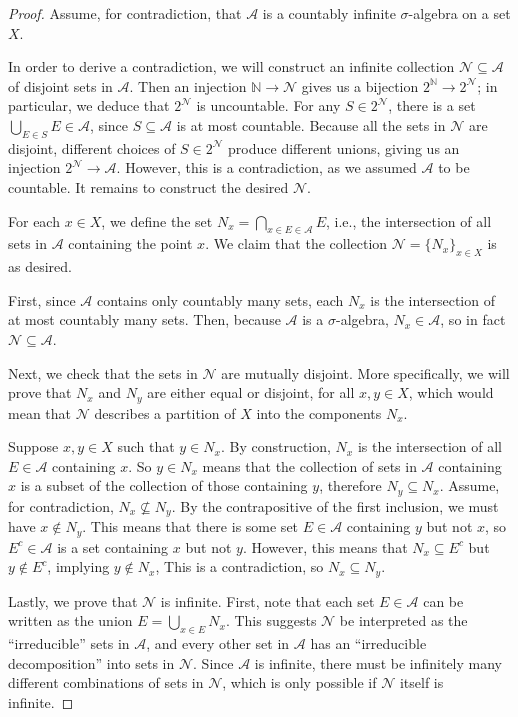 \documentclass[12pt]{article}
\newcommand{\N}{\mathbb{N}}
\newcommand{\<}{\langle}
\renewcommand{\>}{\rangle}
\theoremstyle{definition}
\renewcommand{\AA}{\mathcal{A}}
\newcommand{\NN}{\mathcal{N}}
\begin{document}
\begin{proof}
    Assume, for contradiction, that $\AA$ is a countably infinite $\sigma$-algebra on a set $X$.
    
    In order to derive a contradiction, we will construct an infinite collection $\NN \subseteq \AA$ of disjoint sets in $\AA$. Then an injection $\N \to \NN$ gives us a bijection $2^\N \to 2^\NN$; in particular, we deduce that $2^\NN$ is uncountable. For any $S \in 2^\NN$, there is a set $\bigcup_{E \in S} E \in \AA$, since $S \subseteq \AA$ is at most countable. Because all the sets in $\NN$ are disjoint, different choices of $S \in 2^\NN$ produce different unions, giving us an injection $2^\NN \to \AA$. However, this is a contradiction, as we assumed $\AA$ to be countable. It remains to construct the desired $\NN$.
    
    For each $x \in X$, we define the set $N_x = \bigcap_{x \in E \in \AA} E$, i.e., the intersection of all sets in $\AA$ containing the point $x$. We claim that the collection $\NN = \{N_x\}_{x \in X}$ is as desired.
    
    First, since $\AA$ contains only countably many sets, each $N_x$ is the intersection of at most countably many sets. Then, because $\AA$ is a $\sigma$-algebra, $N_x \in \AA$, so in fact $\NN \subseteq \AA$.
    
    Next, we check that the sets in $\NN$ are mutually disjoint. More specifically, we will prove that $N_x$ and $N_y$ are either equal or disjoint, for all $x, y \in X$, which would mean that $\NN$ describes a partition of $X$ into the components $N_x$.
    
    Suppose $x, y \in X$ such that $y \in N_x$. By construction, $N_x$ is the intersection of all $E \in \AA$ containing $x$. So $y \in N_x$ means that the collection of sets in $\AA$ containing $x$ is a subset of the collection of those containing $y$, therefore $N_y \subseteq N_x$. Assume, for contradiction, $N_x \nsubseteq N_y$. By the contrapositive of the first inclusion, we must have $x \notin N_y$. This means that there is some set $E \in \AA$ containing $y$ but not $x$, so $E^c \in \AA$ is a set containing $x$ but not $y$. However, this means that $N_x \subseteq E^c$ but $y \notin E^c$, implying $y \notin N_x$, This is a contradiction, so $N_x \subseteq N_y$.
    
    Lastly, we prove that $\NN$ is infinite. First, note that each set $E \in \AA$ can be written as the union $E = \bigcup_{x \in E} N_x$. This suggests $\NN$ be interpreted as the ``irreducible'' sets in $\AA$, and every other set in $\AA$ has an ``irreducible decomposition'' into sets in $\NN$. Since $\AA$ is infinite, there must be infinitely many different combinations of sets in $\NN$, which is only possible if $\NN$ itself is infinite.

\end{proof}
\end{document}
